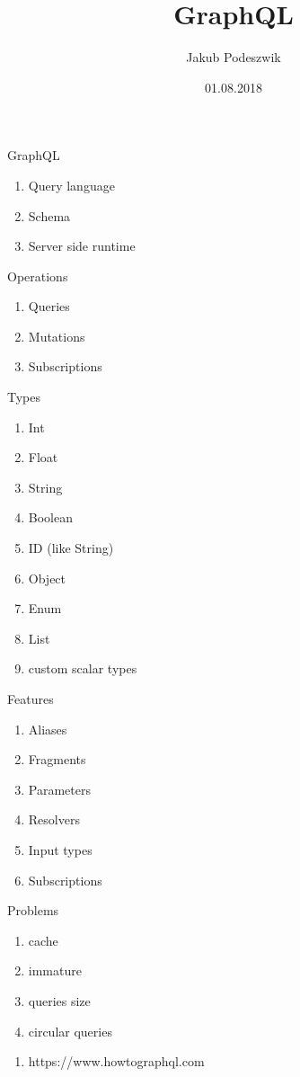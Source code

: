 \documentclass{beamer}
\title[GraphQL]{GraphQL}
\author{Jakub Podeszwik}
\institute{Yameo}
\date{01.08.2018}
\begin{document}
\begin{frame}
  \titlepage
\end{frame}

\begin{frame}{GraphQL}
	\begin{enumerate}
		\item Query language
		\item Schema
		\item Server side runtime
	\end{enumerate}
\end{frame}

\begin{frame}{Operations}
	\begin{enumerate}
		\item Queries
		\item Mutations
		\item Subscriptions
	\end{enumerate}
\end{frame}

\begin{frame}{Types}
	\begin{enumerate}
		\item Int
		\item Float
		\item String
		\item Boolean
		\item ID (like String)
		\item Object
		\item Enum
		\item List
		\item custom scalar types
	\end{enumerate}
\end{frame}

\begin{frame}{Features}
	\begin{enumerate}
		\item Aliases
		\item Fragments
		\item Parameters
		\item Resolvers
		\item Input types
		\item Subscriptions
	\end{enumerate}
\end{frame}

\begin{frame}{Problems}
	\begin{enumerate}
		\item cache
		\item immature
		\item queries size
		\item circular queries
	\end{enumerate}
\end{frame}


\begin{frame}
	\begin{enumerate}
		\item https://www.howtographql.com
	\end{enumerate}
\end{frame}
\end{document}

